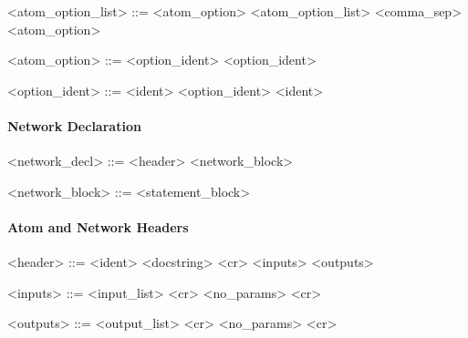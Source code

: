 \vs

\begin{grammar}
  <atom_option_list> ::= <atom_option>
  \alt <atom_option_list> <comma_sep> <atom_option>
\end{grammar}

\vs

\begin{grammar}
  <atom_option> ::= <option_ident> \tn{:} <option_ident>
\end{grammar}

\vs

\begin{grammar}
  <option_ident> ::= <ident>
  \alt <option_ident>  <ident>
\end{grammar}


\paragraph{Network Declaration}

\begin{grammar}
  <network_decl> ::=  <header> <network_block>
\end{grammar}

\vs

\begin{grammar}
  <network_block> ::= <statement_block>
\end{grammar}


\paragraph{Atom and Network Headers}

\begin{grammar}
  <header> ::= <ident> <docstring> <cr> <inputs> <outputs>
\end{grammar}

\vs

\begin{grammar}
  <inputs> ::=  \tn{(} <input_list> \tn{)} <cr>
  \alt {} <no_params> <cr>
\end{grammar}

\vs

\begin{grammar}
  <outputs> ::=  \tn{(} <output_list> \tn{)} <cr>
  \alt {} <no_params> <cr>
\end{grammar}

